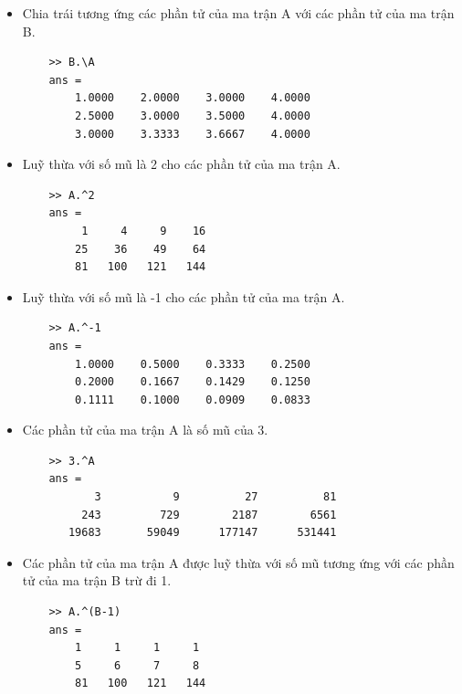 \documentclass[12pt,a4paper]{article}
\begin{document}
\begin{example}
\begin{itemize}
	\item Chia trái tương ứng các phần tử của ma trận A với các phần tử của ma trận B.
\begin{lstlisting}
	>> B.\A
	ans =
    	1.0000    2.0000    3.0000    4.0000
    	2.5000    3.0000    3.5000    4.0000
    	3.0000    3.3333    3.6667    4.0000
\end{lstlisting}
	\item Luỹ thừa với số mũ là  2 cho các phần tử của ma trận A.
\begin{lstlisting}
	>> A.^2
	ans =
     	 1     4     9    16
    	25    36    49    64
    	81   100   121   144
\end{lstlisting}
	\item Luỹ thừa với số mũ là -1 cho các phần tử của ma trận A.
\begin{lstlisting}
	>> A.^-1
	ans =
    	1.0000    0.5000    0.3333    0.2500
    	0.2000    0.1667    0.1429    0.1250
    	0.1111    0.1000    0.0909    0.0833
\end{lstlisting}
	\item Các phần tử của ma trận A là số mũ của 3.
\begin{lstlisting}
	>> 3.^A
	ans =
           3           9          27          81
         243         729        2187        6561
       19683       59049      177147      531441
\end{lstlisting}
	\item Các phần tử của ma trận A được luỹ thừa với số mũ tương ứng với các phần tử của ma trận B trừ đi 1.
\begin{lstlisting}
	>> A.^(B-1)
	ans =
     	1     1     1     1
     	5     6     7     8
    	81   100   121   144
\end{lstlisting}
\end{itemize}
\end{example}
\end{document}
